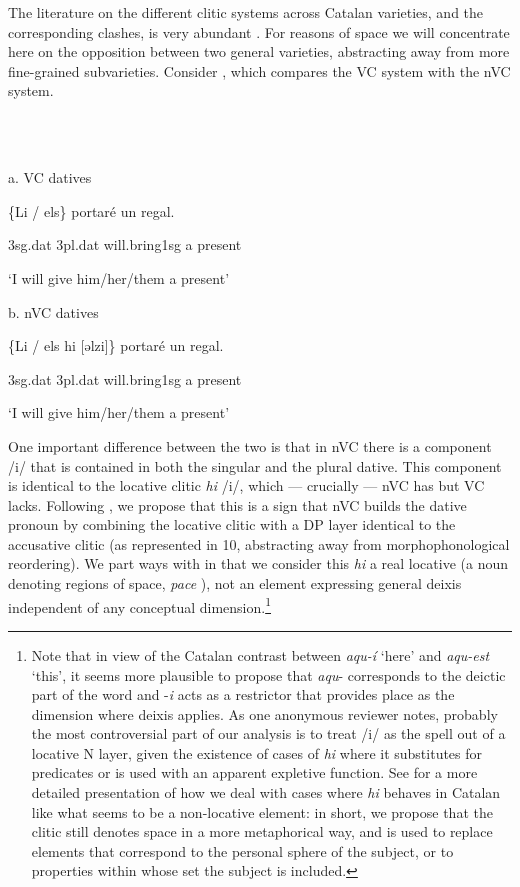 \documentclass[output=paper,colorlinks,citecolor=brown]{./langscibook}
\begin{document}
The literature on the different clitic systems across Catalan varieties, and the corresponding clashes, is very abundant \citep{Bonet1993, Martin2012}. For reasons of space we will concentrate here on the opposition between two general varieties, abstracting away from more fine-grained subvarieties. Consider , which compares the VC system with the nVC system.

\ea%
    \label{ex:key:9}
    \gll\\
        \\
    \glt
    \z

          a.   VC datives

  \{Li  /  els\}     portaré     un regal.

    3sg.dat  3pl.dat  will.bring1sg  a  present

  ‘I will give him/her/them a present’

  b.   nVC datives

  \{Li  /  els hi [ǝlzi]\}   portaré     un regal.

    3sg.dat  3pl.dat  will.bring1sg  a  present

  ‘I will give him/her/them a present’

One important difference between the two is that in nVC there is a component /i/ that is contained in both the singular and the plural dative. This component is identical to the locative clitic \textit{hi} /i/, which — crucially — nVC has but VC lacks. Following \citet{Martin2012}, we propose that this is a sign that nVC builds the dative pronoun by combining the locative clitic with a DP layer identical to the accusative clitic (as represented in 10, abstracting away from morphophonological reordering). We part ways with \citet{Martin2012} in that we consider this \textit{hi} a real locative (a noun denoting regions of space, \textit{pace} \citealt{Rigau1978, Rigau1982}), not an element expressing general deixis independent of any conceptual dimension.\footnote{Note that in view of the Catalan contrast between \textit{aqu-í} ‘here’ and \textit{aqu-est} ‘this’, it seems more plausible to propose that \textit{aqu}{}- corresponds to the deictic part of the word and -\textit{i} acts as a restrictor that provides place as the dimension where deixis applies. As one anonymous reviewer notes, probably the most controversial part of our analysis is to treat /i/ as the spell out of a locative N layer, given the existence of cases of \textit{hi} where it substitutes for predicates or is used with an apparent expletive function. See \citet{CabréFábregas2019} for a more detailed presentation of how we deal with cases where \textit{hi} behaves in Catalan like what seems to be a non-locative element: in short, we propose that the clitic still denotes space in a more metaphorical way, and is used to replace elements that correspond to the personal sphere of the subject, or to properties within whose set the subject is included.} 
\end{document}
